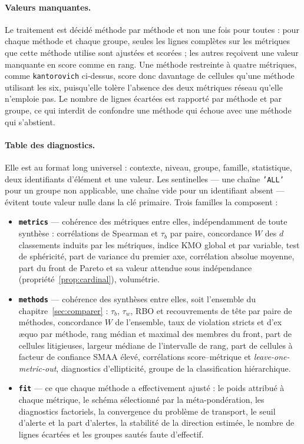 \documentclass[11pt,a4paper]{article}
\theoremstyle{definition}
\theoremstyle{remark}
\begin{document}
\paragraph{Valeurs manquantes.} Le traitement est décidé méthode par méthode et non une fois
pour toutes : pour chaque méthode et chaque groupe, seules les lignes complètes sur les
métriques que cette méthode utilise sont ajustées et scorées ; les autres reçoivent une
valeur manquante en score comme en rang. Une méthode restreinte à quatre métriques, comme
\texttt{kantorovich} ci-dessus, score donc davantage de cellules qu'une méthode utilisant
les six, puisqu'elle tolère l'absence des deux métriques réseau qu'elle n'emploie pas. Le
nombre de lignes écartées est rapporté par méthode et par groupe, ce qui interdit de
confondre une méthode qui échoue avec une méthode qui s'abstient.

\bigskip

\paragraph{Table des diagnostics.} Elle est au format long universel : contexte, niveau,
groupe, famille, statistique, deux identifiants d'élément et une valeur. Les sentinelles
--- une chaîne \texttt{'ALL'} pour un groupe non applicable, une chaîne vide pour un
identifiant absent --- évitent toute valeur nulle dans la clé primaire. Trois familles la
composent :

\medskip

\begin{itemize}[leftmargin=1.4em,itemsep=3pt]
  \item \textbf{\texttt{metrics}} --- cohérence des métriques entre elles, indépendamment
  de toute synthèse : corrélations de Spearman et $\tau_b$ par paire, concordance $W$ des
  $d$ classements induits par les métriques, indice KMO global et par variable, test de
  sphéricité, part de variance du premier axe, corrélation absolue moyenne, part du front
  de Pareto et sa valeur attendue sous indépendance (propriété~\ref{prop:cardinal}),
  volumétrie.
  \item \textbf{\texttt{methods}} --- cohérence des synthèses entre elles, soit l'ensemble
  du chapitre~\ref{sec:comparer} : $\tau_b$, $\tau_w$, RBO et recouvrements de tête par
  paire de méthodes, concordance $W$ de l'ensemble, taux de violation stricts et
  d'ex \ae quo par méthode, rang médian et maximal des membres du front, part de cellules
  litigieuses, largeur médiane de l'intervalle de rang, part de cellules à facteur de
  confiance SMAA élevé, corrélations score--métrique et \emph{leave-one-metric-out},
  diagnostics d'ellipticité, groupe de la classification hiérarchique.
  \item \textbf{\texttt{fit}} --- ce que chaque méthode a effectivement ajusté : le poids
  attribué à chaque métrique, le schéma sélectionné par la méta-pondération, les
  diagnostics factoriels, la convergence du problème de transport, le seuil d'alerte et la
  part d'alertes, la stabilité de la direction estimée, le nombre de lignes écartées et les
  groupes sautés faute d'effectif.
\end{itemize}
\end{document}
